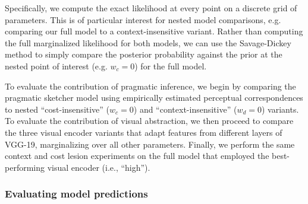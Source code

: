 \documentclass{svjour3}
\begin{document}

Specifically, we compute the exact likelihood at every point on a discrete grid of parameters.
This is of particular interest for nested model comparisons, e.g. comparing our full model to a context-insensitive variant.
Rather than computing the full marginalized likelihood for both models, we can use the Savage-Dickey method \citep*{wagenmakers2010bayesian} to simply compare the posterior probability against the prior at the nested point of interest (e.g. $w_c = 0$) for the full model.

To evaluate the contribution of pragmatic inference, we begin by comparing the pragmatic sketcher model using empirically estimated perceptual correspondences to nested ``cost-insensitive'' ($w_c = 0$) and ``context-insensitive'' ($w_d = 0$) variants. To evaluate the contribution of visual abstraction, we then proceed to compare the three visual encoder variants that adapt features from different layers of VGG-19, marginalizing over all other parameters. Finally, we perform the same context and cost lesion experiments on the full model that employed the best-performing visual encoder (i.e., ``high'').

\subsubsection*{Evaluating model predictions}

\end{document}
